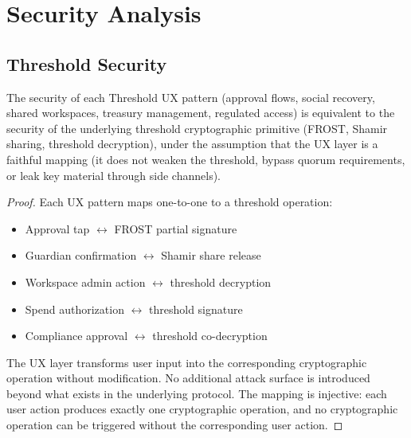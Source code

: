 

\section{Security Analysis}
\label{sec:security}

\subsection{Threshold Security}

\begin{theorem}
The security of each Threshold UX pattern (approval flows, social recovery,
shared workspaces, treasury management, regulated access) is equivalent to
the security of the underlying threshold cryptographic primitive (FROST,
Shamir sharing, threshold decryption), under the assumption that the UX
layer is a faithful mapping (it does not weaken the threshold, bypass
quorum requirements, or leak key material through side channels).
\end{theorem}

\begin{proof}
Each UX pattern maps one-to-one to a threshold operation:
\begin{itemize}
    \item Approval tap $\leftrightarrow$ FROST partial signature
    \item Guardian confirmation $\leftrightarrow$ Shamir share release
    \item Workspace admin action $\leftrightarrow$ threshold decryption
    \item Spend authorization $\leftrightarrow$ threshold signature
    \item Compliance approval $\leftrightarrow$ threshold co-decryption
\end{itemize}
The UX layer transforms user input into the corresponding cryptographic
operation without modification. No additional attack surface is introduced
beyond what exists in the underlying protocol. The mapping is injective:
each user action produces exactly one cryptographic operation, and no
cryptographic operation can be triggered without the corresponding user action.
\end{proof}

